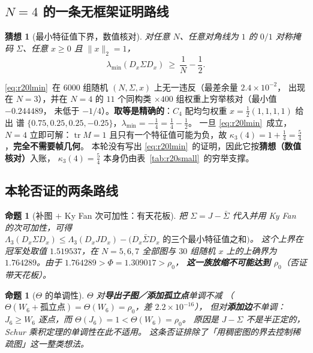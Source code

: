 \documentclass[UTF8,11pt]{ctexart}
\newtheorem{proposition}[theorem]{命题}
\newtheorem{conjecture}[theorem]{猜想}
\theoremstyle{definition}
\newcommand{\Lam}{\Lambda}
\newcommand{\tr}{\operatorname{tr}}
\begin{document}
\subsection{$N=4$ 的一条无框架证明路线}\label{sec:r20:n4}

\begin{conjecture}[最小特征值下界，数值核对]\label{conj:r20lmin}
对任意 $N$、任意对角线为 $1$ 的 $0/1$ 对称掩码 $\Sigma$、任意 $x\ge0$ 且 $\|x\|_2=1$，
\begin{equation}\label{eq:r20lmin}
\lambda_{\min}(D_x\Sigma D_x)\ \ge\ \frac1N-\frac12 .
\end{equation}
\end{conjecture}

\eqref{eq:r20lmin}~在 $6000$ 组随机 $(N,\Sigma,x)$ 上无一违反（最差余量 $2.4\times10^{-2}$，
出现在 $N=3$），并在 $N=4$ 的 $11$ 个同构类 $\times400$ 组权重上穷举核对（最小值 $-0.244489$，
未低于 $-1/4$）。\textbf{取等是精确的}：$C_4$ 配均匀权重 $x=\frac12(1,1,1,1)$ 给出
谱 $\{0.75,0.25,0.25,-0.25\}$，$\lambda_{\min}=-\frac14=\frac14-\frac12$。
一旦 \eqref{eq:r20lmin}~成立，$N=4$ 立即可解：$\tr M=1$ 且只有一个特征值可能为负，故
$\kappa_3(4)=1+\frac14=\frac54$，\textbf{完全不需要帧几何}。
本轮没有写出 \eqref{eq:r20lmin}~的证明，因此它按\textbf{猜想（数值核对）}入账，
$\kappa_3(4)=\frac54$ 本身仍由表~\ref{tab:r20small}~的穷举支撑。

\subsection{本轮否证的两条路线}\label{sec:r20:ref}

\begin{proposition}[补图 $+$ Ky Fan 次可加性：有天花板]\label{prop:r20comp}
把 $\Sigma=J-\bar\Sigma$ 代入并用 Ky Fan 的次可加性，可得
$\Lam_3(D_x\Sigma D_x)\le\Lam_3(D_xJD_x)-\bigl(\text{$D_x\bar\Sigma D_x$ 的三个最小特征值之和}\bigr)$。
这个上界在冠军处取值 $1.519537$，在 $N=5,6,7$ 全部图与 $30$ 组随机 $x$ 上的上确界为
$1.764289$。由于 $1.764289>\Phi=1.309017>\rho_0$，
\textbf{这一族放缩不可能达到 $\rho_0$}（否证带天花板）。
\end{proposition}

\begin{proposition}[$\Theta$ 的单调性]\label{prop:r20mono}
$\Theta$ 对\textbf{导出子图／添加孤立点}单调不减
（$\Theta(W_6+\text{孤立点})=\Theta(W_6)=\rho_0$，差 $2.2\times10^{-16}$），
但对\textbf{添加边}不单调：$J_6\ge W_6$ 逐点，而 $\Theta(J_6)=1<\Theta(W_6)=\rho_0$。
原因是 $J-\Sigma$ 不是半正定的，Schur 乘积定理的单调性在此不适用。
这条否证排除了「用稠密图的界去控制稀疏图」这一整类想法。
\end{proposition}
\end{document}
